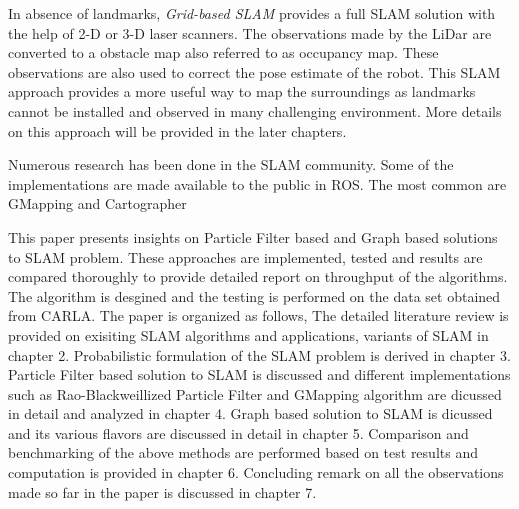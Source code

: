 In absence of landmarks, \textit{Grid-based SLAM} provides a full SLAM solution with the help of 2-D or 3-D laser scanners. The observations made by the LiDar are 
converted to a obstacle map also referred to as occupancy map. These observations are also used to correct the pose estimate of the robot. This SLAM approach provides
a more useful way to map the surroundings as landmarks cannot be installed and observed in many challenging environment. More details on this approach will be provided in the 
later chapters.

Numerous research has been done in the SLAM community. Some of the implementations are made available to the public in ROS. The most common are GMapping and Cartographer

This paper presents insights on Particle Filter based and Graph based solutions to SLAM problem. These approaches are implemented, tested and results are compared thoroughly 
to provide detailed report on throughput of the algorithms. The algorithm is desgined and the testing is performed on the data set obtained from CARLA. The paper is organized 
as follows, The detailed literature review is provided on exisiting SLAM algorithms and applications, variants of SLAM in chapter 2. Probabilistic formulation of the SLAM
problem is derived in chapter 3. Particle Filter based solution to SLAM is discussed and different implementations such as Rao-Blackweillized Particle Filter and GMapping
algorithm are dicussed in detail and analyzed in chapter 4. Graph based solution to SLAM is dicussed and its various flavors are discussed in detail in chapter 5.
Comparison and benchmarking of the above methods are performed based on test results and computation is provided in chapter 6. Concluding remark on all the observations 
made so far in the paper is discussed in chapter 7.



